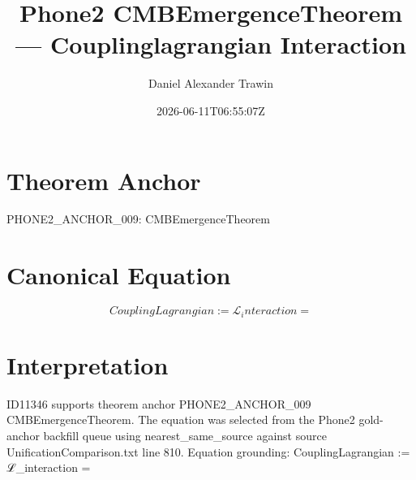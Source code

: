 \documentclass[11pt]{article}
\title{Phone2 CMBEmergenceTheorem — Couplinglagrangian Interaction}
\author{Daniel Alexander Trawin}
\date{2026-06-11T06:55:07Z}
\begin{document}
\maketitle
\section*{Theorem Anchor}
PHONE2_ANCHOR_009: CMBEmergenceTheorem
\section*{Canonical Equation}
\[
CouplingLagrangian := ℒ_interaction =
\]
\section*{Interpretation}
ID11346 supports theorem anchor PHONE2_ANCHOR_009 CMBEmergenceTheorem. The equation was selected from the Phone2 gold-anchor backfill queue using nearest_same_source against source UnificationComparison.txt line 810. Equation grounding: CouplingLagrangian := ℒ_interaction =
\end{document}
